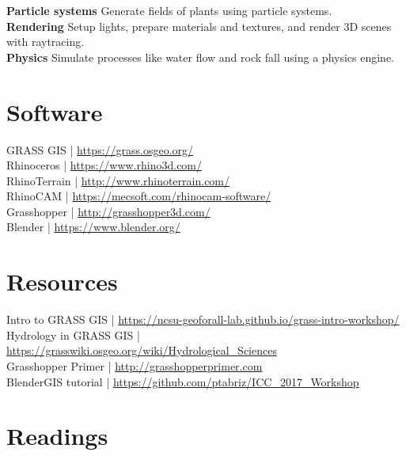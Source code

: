 \documentclass[11pt,article,oneside]{memoir}
\begin{document}
\noindent \textbf{Particle systems}
Generate fields of plants 
using particle systems. \\

\noindent \textbf{Rendering}
Setup lights, prepare materials and textures, 
and render 3D scenes with raytracing.\\

\noindent \textbf{Physics}
Simulate processes like water flow and rock fall
using a physics engine.\\


\section{Software}
GRASS GIS | \url{https://grass.osgeo.org/} \\
Rhinoceros | \url{https://www.rhino3d.com/}\\
RhinoTerrain | \url{http://www.rhinoterrain.com/}\\
RhinoCAM | \url{https://mecsoft.com/rhinocam-software/}\\
Grasshopper | \url{http://grasshopper3d.com/}\\
Blender | \url{https://www.blender.org/}\\

\section{Resources}
Intro to GRASS GIS | \url{https://ncsu-geoforall-lab.github.io/grass-intro-workshop/}\\
Hydrology in GRASS GIS | \url{https://grasswiki.osgeo.org/wiki/Hydrological_Sciences}\\
Grasshopper Primer | \url{http://grasshopperprimer.com}\\
BlenderGIS tutorial | \url{https://github.com/ptabriz/ICC_2017_Workshop}

\section{Readings}
\renewcommand*{\bibfont}{\normalsize} %
\vspace*{0.5cm}
\nocite{*}
\setlength{}
\printbibliography[heading=none]
\end{document}
